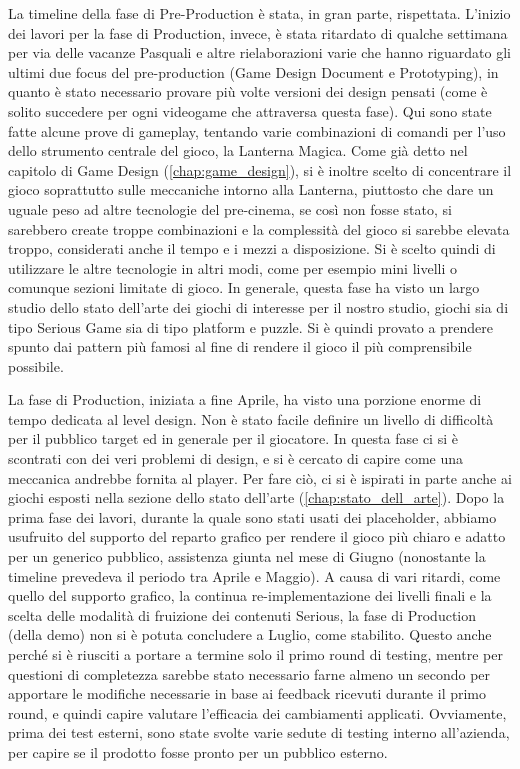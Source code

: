 \begin{itemize}
\end{itemize}

La timeline della fase di Pre-Production è stata, in gran parte, rispettata.
L'inizio dei lavori per la fase di Production, invece, è stata ritardato di qualche settimana per via delle vacanze Pasquali e altre rielaborazioni varie che hanno riguardato gli ultimi due focus del pre-production (Game Design Document e Prototyping), in quanto è stato necessario provare più volte versioni dei design pensati (come è solito succedere per ogni videogame che attraversa questa fase). Qui sono state fatte alcune prove di gameplay, tentando varie combinazioni di comandi per l'uso dello strumento centrale del gioco, la Lanterna Magica. Come già detto nel capitolo di Game Design (\ref{chap:game_design}), si è inoltre scelto di concentrare il gioco soprattutto sulle meccaniche intorno alla Lanterna, piuttosto che dare un uguale peso ad altre tecnologie del pre-cinema, se così non fosse stato, si sarebbero create troppe combinazioni e la complessità del gioco si sarebbe elevata troppo, considerati anche il tempo e i mezzi a disposizione. Si è scelto quindi di utilizzare le altre tecnologie in altri modi, come per esempio mini livelli o comunque sezioni limitate di gioco. In generale, questa fase ha visto un largo studio dello stato dell'arte dei giochi di interesse per il nostro studio, giochi sia di tipo Serious Game sia di tipo platform e puzzle. Si è quindi provato a prendere spunto dai pattern più famosi al fine di rendere il gioco il più comprensibile possibile.

La fase di Production, iniziata a fine Aprile, ha visto una porzione enorme di tempo dedicata al level design. Non è stato facile definire un livello di difficoltà per il pubblico target ed in generale per il giocatore. In questa fase ci si è scontrati con dei veri problemi di design, e si è cercato di capire come una meccanica andrebbe fornita al player. Per fare ciò, ci si è ispirati in parte anche ai giochi esposti nella sezione dello stato dell'arte (\ref{chap:stato_dell_arte}). Dopo la prima fase dei lavori, durante la quale sono stati usati dei placeholder, abbiamo usufruito del supporto del reparto grafico per rendere il gioco più chiaro e adatto per un generico pubblico, assistenza giunta nel mese di Giugno (nonostante la timeline prevedeva il periodo tra Aprile e Maggio). A causa di vari ritardi, come quello del supporto grafico, la continua re-implementazione dei livelli finali e la scelta delle modalità di fruizione dei contenuti Serious, la fase di Production (della demo) non si è potuta concludere a Luglio, come stabilito. Questo anche perché si è riusciti a portare a termine solo il primo round di testing, mentre per questioni di completezza sarebbe stato necessario farne almeno un secondo per apportare le modifiche necessarie in base ai feedback ricevuti durante il primo round, e quindi capire valutare l'efficacia dei cambiamenti applicati. Ovviamente, prima dei test esterni, sono state svolte varie sedute di testing interno all'azienda, per capire se il prodotto fosse pronto per un pubblico esterno.


